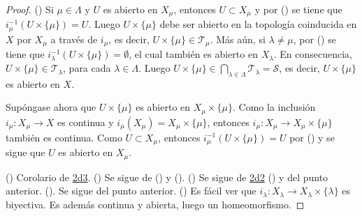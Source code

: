 \begin{proof}
({\scshape{}}) Si $\mu \in \Lambda$ y $U$ es abierto en $X_{\mu}$, entonces $U \subset X_{\mu}$ y por ({\scshape{}}) se tiene que $i^{-1}_{\mu}(U \times \{ \mu \}) = U$. Luego $U \times \{ \mu \}$ debe ser abierto en la topología coinducida en $X$ por $X_{\mu}$ a través de $i_{\mu}$, es decir, $U \times \{ \mu \} \in \mathcal{T}_{\mu}$. Más aún, si $\lambda \ne \mu$, por ({\scshape{}}) se tiene que $i^{-1}_{\lambda}(U \times \{ \mu \}) = \emptyset$, el cual también es abierto en $X_{\lambda}$. En consecuencia, $U \times \{ \mu \} \in \mathcal{T}_{\lambda}$, para cada $\lambda \in \Lambda$. Luego $U \times \{ \mu \} \in \bigcap_{\lambda \in \Lambda} \mathcal{T}_{\lambda} = \mathcal{S}$, es decir, $U \times \{ \mu \}$ es abierto en $X$.
\bigskip

Supóngase ahora que $U \times \{ \mu \}$ es abierto en $X_{\mu} \times \{ \mu \}$. Como la inclusión $i_{\mu} : X_{\mu} \longrightarrow X$ es continua y $i_{\mu}(X_{\mu}) = X_{\mu} \times \{ \mu \}$, entonces $i_{\mu} : X_{\mu} \longrightarrow X_{\mu} \times \{ \mu \}$ también es continua. Como $U \subset X_{\mu}$, entonces $i^{-1}_{\mu}(U \times \{ \mu \}) = U$ por ({\scshape{}}) y se sigue que $U$ es abierto en $X_{\mu}$.
\bigskip

({\scshape{}}) Corolario de \hyperref[card:2d3]{\textsf{2d3}}. ({\scshape{}}) Se sigue de ({\scshape{}}) y ({\scshape{}}). ({\scshape{}}) Se sigue de \hyperref[card:2d2]{\textsf{2d2}} ({\scshape{}}) y del punto anterior. ({\scshape{}}). Se sigue del punto anterior. ({\scshape{}}) Es fácil ver que $i_{\lambda} : X_{\lambda} \longrightarrow X_{\lambda} \times \{ \lambda \}$ es biyectiva. Es además continua y abierta, luego un homeomorfismo.

\end{proof}
